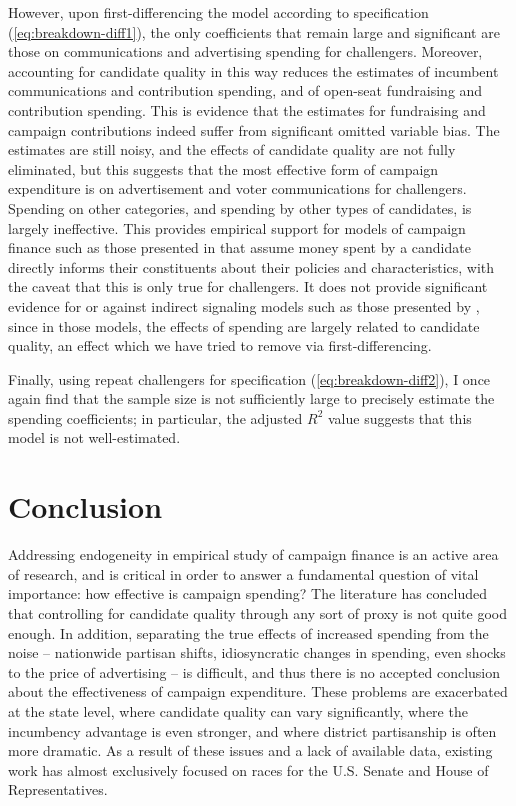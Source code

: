 \documentclass{article}
\begin{document}
However, upon first-differencing the model according to specification (\ref{eq:breakdown-diff1}), the only coefficients that remain large and significant are those on communications and advertising spending for challengers. Moreover, accounting for candidate quality in this way reduces the estimates of incumbent communications and contribution spending, and of open-seat fundraising and contribution spending. This is evidence that the estimates for fundraising and campaign contributions indeed suffer from significant omitted variable bias. The estimates are still noisy, and the effects of candidate quality are not fully eliminated, but this suggests that the most effective form of campaign expenditure is on advertisement and voter communications for challengers. Spending on other categories, and spending by other types of candidates, is largely ineffective. This provides empirical support for models of campaign finance such as those presented in \cite{coate2004pareto} that assume money spent by a candidate directly informs their constituents about their policies and characteristics, with the caveat that this is only true for challengers. It does not provide significant evidence for or against indirect signaling models such as those presented by \cite{prat2002campaign}, since in those models, the effects of spending are largely related to candidate quality, an effect which we have tried to remove via first-differencing.

Finally, using repeat challengers for specification (\ref{eq:breakdown-diff2}), I once again find that the sample size is not sufficiently large to precisely estimate the spending coefficients; in particular, the adjusted $R^2$ value suggests that this model is not well-estimated.

\section{Conclusion}

Addressing endogeneity in empirical study of campaign finance is an active area of research, and is critical in order to answer a fundamental question of vital importance: how effective is campaign spending? The literature has concluded that controlling for candidate quality through any sort of proxy is not quite good enough. In addition, separating the true effects of increased spending from the noise -- nationwide partisan shifts, idiosyncratic changes in spending, even shocks to the price of advertising -- is difficult, and thus there is no accepted conclusion about the effectiveness of campaign expenditure. These problems are exacerbated at the state level, where candidate quality can vary significantly, where the incumbency advantage is even stronger, and where district partisanship is often more dramatic. As a result of these issues and a lack of available data, existing work has almost exclusively focused on races for the U.S. Senate and House of Representatives.
\end{document}
